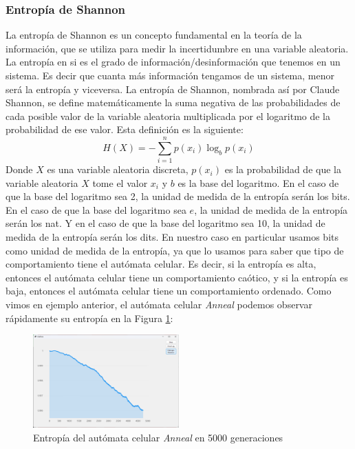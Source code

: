 \subsubsection{Entrop\'ia de Shannon}
\label{sec:Entriopia}
    La entrop\'ia de Shannon es un concepto fundamental en la teor\'ia de la informaci\'on, 
        que se utiliza para medir la incertidumbre en una variable aleatoria. La entrop\'ia en si 
        es el grado de informaci\'on/desinformaci\'on que tenemos en un sistema. Es decir que cuanta m\'as
        informaci\'on tengamos de un sistema, menor ser\'a la entrop\'ia y viceversa. La entrop\'ia de Shannon, 
        nombrada as\'i por Claude Shannon\cite{Shannon1948}, se define matem\'aticamente la suma negativa de las probabilidades de cada
        posible valor de la variable aleatoria multiplicada por el logaritmo de la probabilidad de ese valor. Esta
        definici\'on es la siguiente:
        \begin{equation}
            H(X) = -\sum_{i=1}^{n} p(x_i) \log_b p(x_i)
        \end{equation}
    \vskip 0.5cm
    Donde $X$ es una variable aleatoria discreta, $p(x_i)$ es la probabilidad de que la variable aleatoria 
        $X$ tome el valor $x_i$ y $b$ es la base del logaritmo. En el caso de que la base del logaritmo sea 2, 
        la unidad de medida de la entrop\'ia ser\'an los bits. En el caso de que la base del logaritmo sea $e$,
        la unidad de medida de la entrop\'ia ser\'an los nat. Y en el caso de que la base del logaritmo sea 10, 
        la unidad de medida de la entrop\'ia ser\'an los dits.
    \vskip 0.5cm
    En nuestro caso en particular usamos bits como unidad de medida de la entrop\'ia, ya que lo usamos para saber que tipo de comportamiento
        tiene el aut\'omata celular. Es decir, si la entrop\'ia es alta, entonces el aut\'omata celular tiene un comportamiento ca\'otico, y si 
        la entrop\'ia es baja, entonces el aut\'omata celular tiene un comportamiento ordenado.
    \vskip 0.5cm
    Como vimos en ejemplo anterior, el aut\'omata celular \textit{Anneal} podemos observar r\'apidamente su entrop\'ia
        en la Figura \ref{fig:annealEntropia}: 
        \begin{figure}[h]
            \centering
            \includegraphics[width=0.5\textwidth]{./images/marco_teorico/automatas_celulares/Anneal5kShann.png}
            \caption{Entrop\'ia del aut\'omata celular \textit{Anneal} en 5000 generaciones}
            \label{fig:annealEntropia}  
        \end{figure}